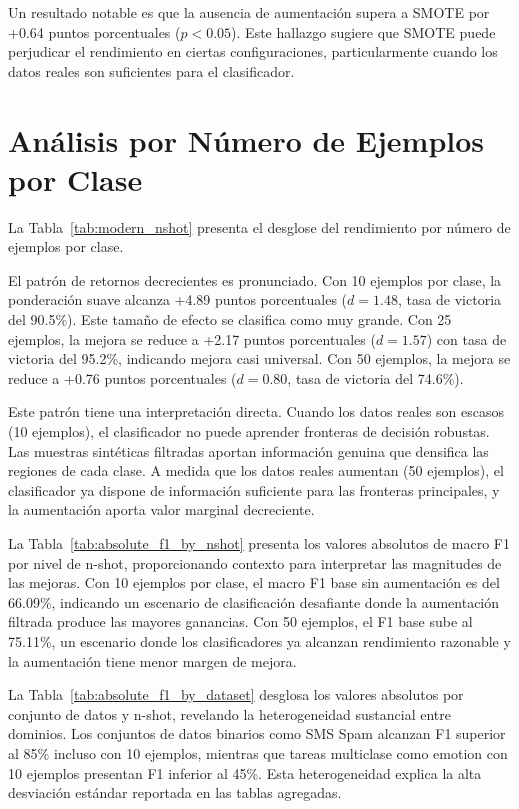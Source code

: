Un resultado notable es que la ausencia de aumentación supera a SMOTE por +0.64 puntos porcentuales ($p < 0.05$). Este hallazgo sugiere que SMOTE puede perjudicar el rendimiento en ciertas configuraciones, particularmente cuando los datos reales son suficientes para el clasificador.

\section{Análisis por Número de Ejemplos por Clase}
\label{sec:analisis_nshot}

La Tabla~\ref{tab:modern_nshot} presenta el desglose del rendimiento por número de ejemplos por clase.



El patrón de retornos decrecientes es pronunciado. Con 10 ejemplos por clase, la ponderación suave alcanza +4.89 puntos porcentuales ($d = 1.48$, tasa de victoria del 90.5\%). Este tamaño de efecto se clasifica como muy grande. Con 25 ejemplos, la mejora se reduce a +2.17 puntos porcentuales ($d = 1.57$) con tasa de victoria del 95.2\%, indicando mejora casi universal. Con 50 ejemplos, la mejora se reduce a +0.76 puntos porcentuales ($d = 0.80$, tasa de victoria del 74.6\%).

Este patrón tiene una interpretación directa. Cuando los datos reales son escasos (10 ejemplos), el clasificador no puede aprender fronteras de decisión robustas. Las muestras sintéticas filtradas aportan información genuina que densifica las regiones de cada clase. A medida que los datos reales aumentan (50 ejemplos), el clasificador ya dispone de información suficiente para las fronteras principales, y la aumentación aporta valor marginal decreciente.

La Tabla~\ref{tab:absolute_f1_by_nshot} presenta los valores absolutos de macro F1 por nivel de n-shot, proporcionando contexto para interpretar las magnitudes de las mejoras. Con 10 ejemplos por clase, el macro F1 base sin aumentación es del 66.09\%, indicando un escenario de clasificación desafiante donde la aumentación filtrada produce las mayores ganancias. Con 50 ejemplos, el F1 base sube al 75.11\%, un escenario donde los clasificadores ya alcanzan rendimiento razonable y la aumentación tiene menor margen de mejora.



La Tabla~\ref{tab:absolute_f1_by_dataset} desglosa los valores absolutos por conjunto de datos y n-shot, revelando la heterogeneidad sustancial entre dominios. Los conjuntos de datos binarios como SMS Spam alcanzan F1 superior al 85\% incluso con 10 ejemplos, mientras que tareas multiclase como emotion con 10 ejemplos presentan F1 inferior al 45\%. Esta heterogeneidad explica la alta desviación estándar reportada en las tablas agregadas.

